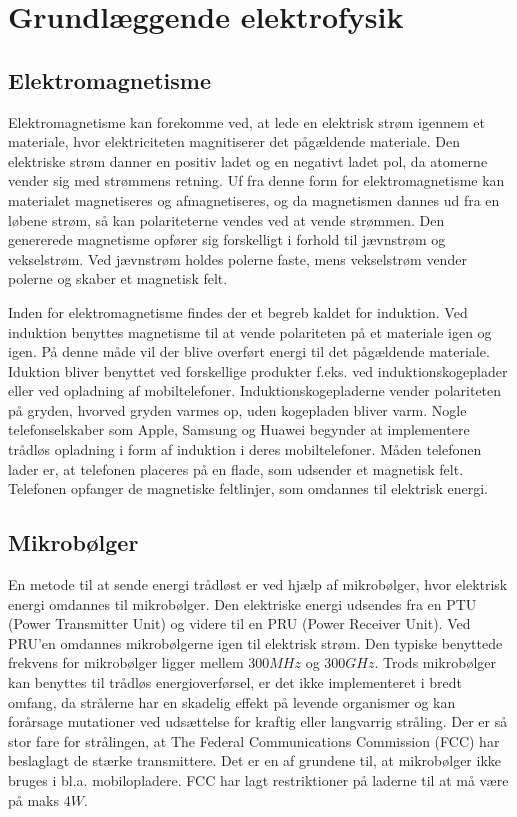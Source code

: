 \section{Grundlæggende elektrofysik}

\subsection{Elektromagnetisme}
Elektromagnetisme kan forekomme ved, at lede en elektrisk strøm igennem et materiale, hvor elektriciteten magnitiserer det pågældende materiale. Den elektriske strøm danner en positiv ladet og en negativt ladet pol, da atomerne vender sig med strømmens retning. Uf fra denne form for elektromagnetisme kan materialet magnetiseres og afmagnetiseres, og da magnetismen dannes ud fra en løbene strøm, så kan polariteterne vendes ved at vende strømmen. Den genererede magnetisme opfører sig forskelligt i forhold til jævnstrøm og vekselstrøm. Ved jævnstrøm holdes polerne faste, mens vekselstrøm vender polerne og skaber et magnetisk felt.

Inden for elektromagnetisme findes der et begreb kaldet for induktion. Ved induktion benyttes magnetisme til at vende polariteten på et materiale igen og igen. På denne måde vil der blive overført energi til det pågældende materiale. Iduktion bliver benyttet ved forskellige produkter f.eks. ved induktionskogeplader eller ved opladning af mobiltelefoner. Induktionskogepladerne vender polariteten på gryden, hvorved gryden varmes op, uden kogepladen bliver varm. Nogle telefonselskaber som Apple, Samsung og Huawei begynder at implementere trådløs opladning i form af induktion i deres mobiltelefoner. Måden telefonen lader er, at telefonen placeres på en flade, som udsender et magnetisk felt. Telefonen opfanger de magnetiske feltlinjer, som omdannes til elektrisk energi. \cite{mikro}

\subsection{Mikrobølger}

En metode til at sende energi trådløst er ved hjælp af mikrobølger, hvor elektrisk energi omdannes til mikrobølger. Den elektriske energi udsendes fra en PTU (Power Transmitter Unit) og videre til en PRU (Power Receiver Unit). Ved PRU'en omdannes mikrobølgerne igen til elektrisk strøm. Den typiske benyttede frekvens for mikrobølger ligger mellem $300 MHz$ og $300 GHz$. Trods mikrobølger kan benyttes til trådløs energioverførsel, er det ikke implementeret i bredt omfang, da strålerne har en skadelig effekt på levende organismer og kan forårsage mutationer ved udsættelse for kraftig eller langvarrig stråling. Der er så stor fare for strålingen, at The Federal Communications Commission (FCC) har beslaglagt de stærke transmittere. Det er en af grundene til, at mikrobølger ikke bruges i bl.a. mobilopladere. FCC har lagt restriktioner på laderne til at må være på maks $4 W$. \cite{mikro}

\newpage
